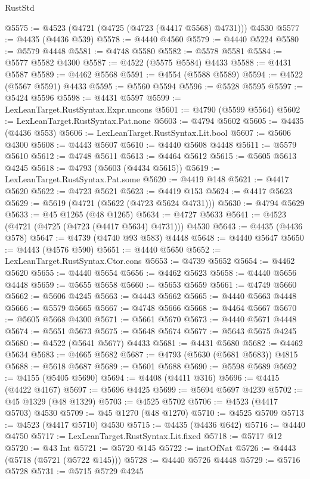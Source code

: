 \begin{lexlean}{RustStd}
\begin{coremodule}
{\begin{coremodule}
{{{{{{{{{{{{{{{{{{{{{{{{{{{{{{{{{{{{{{{{{{{{{{{{{{{{{{{{{{{{@5575 := @4523 (@4721 (@4725 (@4723 (@4417 @5568) @4731))) @4530
@5577 := @4435 (@4436 @539)
@5578 := @4440 @4560
@5579 := @4440 @5224
@5580 := @5579 @4448
@5581 := @4748 @5580
@5582 := @5578 @5581
@5584 := @5577 @5582 @4300
@5587 := @4522 (@5575 @5584) @4433
@5588 := @4431 @5587
@5589 := @4462 @5568
@5591 := @4554 (@5588 @5589)
@5594 := @4522 (@5567 @5591) @4433
@5595 := @5560 @5594
@5596 := @5528 @5595
@5597 := @5424 @5596
@5598 := @4431 @5597
@5599 := LexLeanTarget.RustSyntax.Expr.uncons
@5601 := @4790 (@5599 @5564)
@5602 := LexLeanTarget.RustSyntax.Pat.none
@5603 := @4794 @5602
@5605 := @4435 (@4436 @553)
@5606 := LexLeanTarget.RustSyntax.Lit.bool
@5607 := @5606 @4300
@5608 := @4443 @5607
@5610 := @4440 @5608 @4448
@5611 := @5579 @5610
@5612 := @4748 @5611
@5613 := @4464 @5612
@5615 := @5605 @5613 @4245
@5618 := @4793 (@5603 (@4434 @5615))
@5619 := LexLeanTarget.RustSyntax.Pat.some
@5620 := @4419 @148
@5621 := @4417 @5620
@5622 := @4723 @5621
@5623 := @4419 @153
@5624 := @4417 @5623
@5629 := @5619 (@4721 (@5622 (@4723 @5624 @4731)))
@5630 := @4794 @5629
@5633 := @45 @1265 (@48 @1265)
@5634 := @4727 @5633
@5641 := @4523 (@4721 (@4725 (@4723 (@4417 @5634) @4731))) @4530
@5643 := @4435 (@4436 @578)
@5647 := @4739 (@4740 @93 @583) @4448
@5648 := @4440 @5647
@5650 := @4443 (@4576 @590)
@5651 := @4440 @5650
@5652 := LexLeanTarget.RustSyntax.Ctor.cons
@5653 := @4739 @5652
@5654 := @4462 @5620
@5655 := @4440 @5654
@5656 := @4462 @5623
@5658 := @4440 @5656 @4448
@5659 := @5655 @5658
@5660 := @5653 @5659
@5661 := @4749 @5660
@5662 := @5606 @4245
@5663 := @4443 @5662
@5665 := @4440 @5663 @4448
@5666 := @5579 @5665
@5667 := @4748 @5666
@5668 := @4464 @5667
@5670 := @5605 @5668 @4300
@5671 := @5661 @5670
@5673 := @4440 @5671 @4448
@5674 := @5651 @5673
@5675 := @5648 @5674
@5677 := @5643 @5675 @4245
@5680 := @4522 (@5641 @5677) @4433
@5681 := @4431 @5680
@5682 := @4462 @5634
@5683 := @4665 @5682
@5687 := @4793 (@5630 (@5681 @5683)) @4815
@5688 := @5618 @5687
@5689 := @5601 @5688
@5690 := @5598 @5689
@5692 := @4155 (@5405 @5690)
@5694 := @4408 (@4411 @316)
@5696 := @4415 (@4422 @4167)
@5697 := @5696 @4425
@5699 := @5694 @5697 @4239
@5702 := @45 @1329 (@48 @1329)
@5703 := @4525 @5702
@5706 := @4523 (@4417 @5703) @4530
@5709 := @45 @1270 (@48 @1270)
@5710 := @4525 @5709
@5713 := @4523 (@4417 @5710) @4530
@5715 := @4435 (@4436 @642)
@5716 := @4440 @4750
@5717 := LexLeanTarget.RustSyntax.Lit.fixed
@5718 := @5717 @12
@5720 := @43 Int
@5721 := @5720 @145
@5722 := instOfNat
@5726 := @4443 (@5718 (@5721 (@5722 @145)))
@5728 := @4440 @5726 @4448
@5729 := @5716 @5728
@5731 := @5715 @5729 @4245
}}}}}}}}}}}}}}}}}}}}}}}}}}}}}}}}}}}}}}}}}}}}}}}}}}}}}}}}}}}}
\end{coremodule}}
\end{coremodule}
\end{lexlean}
